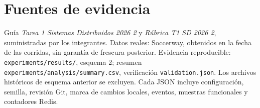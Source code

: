 \documentclass[11pt]{article}
\begin{document}
\section{Fuentes de evidencia}
Guía \textit{Tarea 1 Sistemas Distribuidos 2026 2} y \textit{Rúbrica T1 SD 2026 2}, suministradas por los integrantes. Datos reales: Soccerway, obtenidos en la fecha de las corridas, sin garantía de frescura posterior. Evidencia reproducible: \texttt{experiments/results/}, esquema 2; resumen \texttt{experiments/analysis/summary.csv}, verificación \texttt{validation.json}. Los archivos históricos de esquema anterior se excluyen. Cada JSON incluye configuración, semilla, revisión Git, marca de cambios locales, eventos, muestras funcionales y contadores Redis.
\end{document}
